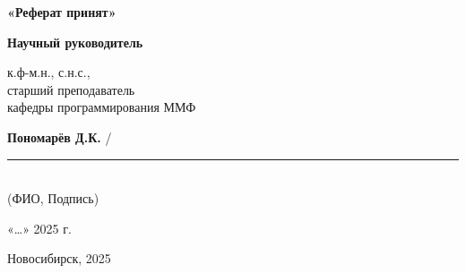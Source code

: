 \hspace*{\fill} %
\begin{minipage}[t]{0.5\textwidth}
  \textbf{«Реферат принят»}
  
  \vspace{0.5cm} %
  
  \textbf{Научный руководитель}
  
  \vspace{0.5cm} %
  
  к.ф-м.н., с.н.с., \\
  старший преподаватель \\
  кафедры программирования ММФ
  
  \vspace{1cm} %
  \textbf{Пономарёв Д.К.} / \rule{4cm}{0.4pt} \\ %
  \small (ФИО, Подпись) %

  \vspace{1cm} %

  «\ldots»\makebox[7em]{\dotfill} 2025 г. %
\end{minipage}

\vfill %

\begin{center}
Новосибирск, 2025
\end{center}
